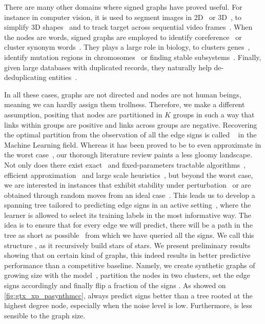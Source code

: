 There are many other domains where signed graphs have proved useful. For instance in computer
vision, it is used to segment images in 2D~\autocites{Kim2011}{Bagon2011}{CellSeg14} or
3D~\autocites{VolumeSegmentation12}{Beier2015}, to simplify 3D shapes~\autocite{Shape3D17} and to
track target across sequential video frames~\autocite{multiTracking15}. When the nodes are words,
signed graphs are employed to identify coreference~\autocites{graphicalCoreference04}{Elsner2009} or
cluster synonym words~\autocite{SignedWordRatings}. They plays a large role in biology, to clusters
genes~\autocite{Ben-Dor99}, identify mutation regions in chromosomes~\autocite{Das2015} or finding
stable subsystems~\autocite{monotoneBiology07}. Finally, given large databases with duplicated
records, they naturally help de-deduplicating
entities~\autocites{Crosslingual07}{DeDup09}{LargeScaleDeDup09}{WeightedER14}.

In all these cases, graphs are not directed and nodes are not human beings, meaning we can hardly
assign them trollness.  Therefore, we make a different assumption, positing that nodes are
partitioned in $K$ groups in such a way that links within groups are positive and links across
groups are negative. Recovering the optimal partition from the observation of all the edge signs is
called \pcc{}~\autocite{Bansal2002} in the Machine Learning field. Whereas it has been proved to be
\NPc{} to even approximate in the worst case~\autocites{Charikar2003}{Demaine2006}, our thorough
literature review paints a less gloomy landscape. Not only does there exist
exact~\autocite{Berg2015} and fixed-parameters tractable algorithms~\autocites{GoldenCE12}{Fomin2014},
efficient approximation~\autocites{CCPivotConf05}{ChawlaArxiv14} and large scale
heuristics~\autocites{Levorato2015}{Facchetti2011isingmodel}{Kappes2016}, but beyond the worst case,
we are interested in instances that exhibit stability under
perturbation~\autocites{clusteringFeasibility15}{StableCC09}{StableLP09} or are obtained through
random moves from an ideal case~\autocites{plantedAilon09}{Makarychev2014}. This leads us to develop
a spanning tree tailored to predicting edge signs in an active setting~\autocite{Cesa-Bianchi2012b},
where the learner is allowed to select its training labels in the most informative way. The idea is
to ensure that for every edge we will predict, there will be a path in the tree as short as
possible~\autocites{LowerBound95}{Abraham2012} from which we have queried all the signs. We call
this structure \gtx{}, as it recursively build stars of stars. 
We present preliminary results showing that on certain
kind of graphs, this indeed results in better predictive performance than a competitive baseline.
Namely, we create synthetic graphs of growing size with the \lpa{} model~\autocite{Barabasi1999},
partition the nodes in two clusters, set the edge signs accordingly and finally flip a fraction of
the signs \uar{}. As showed on \autoref{fig:gtx_xp_pasynthmcc}, \gtx{} always predict signs better than a
\bfs{} tree rooted at the highest degree node, especially when the noise level is low. Furthermore,
\gtx{} is less sensible to the graph size.

